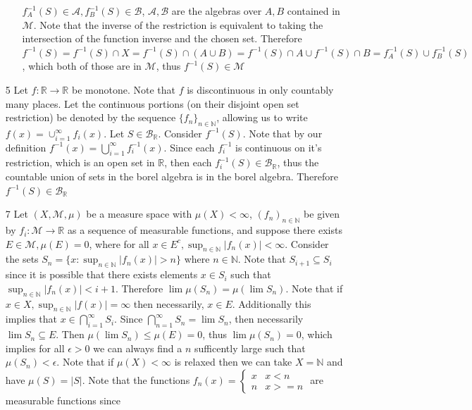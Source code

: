\documentclass[12pt, letterpaper]{article}
\newcommand{\N}{\mathbb{N}}
\newcommand{\R}{\mathbb{R}}
\begin{document}
\begin{enumerate}
\begin{itemize}
		$f_A^{-1}(S) \in \mathcal{A},f_B^{-1}(S) \in \mathcal{B}$, $\mathcal{A}, \mathcal{B}$ are the algebras over $A,B$ contained in $\mathcal{M}$.  Note that 
		the inverse of the restriction is equivalent to taking the intersection of the function inverse and the chosen set.  Therefore $f^{-1}(S) = f^{-1}(S) \cap X = f^{-1}(S) \cap (A \cup B) =
		f^{-1}(S) \cap A \cup f^{-1}(S) \cap B = f_A^{-1}(S) \cup f_B^{-1}(S)$, which 
		both of those are in $\mathcal{M}$, thus $f^{-1}(S) \in \mathcal{M}$
	\end{itemize}
	\item[5] Let $f: \R \to \R$ be monotone.  Note that $f$
	is discontinuous in only countably many places.  Let the continuous portions (on their disjoint open set restriction)
	be denoted by the sequence $\{f_n\}_{n \in \N}$, allowing us to write 
	$f(x) = \cup_{i=1}^\infty f_i(x)$.    Let $S \in \mathcal{B}_\R$.  
	Consider $f^{-1}(S)$.  Note that by our definition $f^{-1}(x) = \bigcup_{i=1}^\infty f^{-1}_i(x)$.  Since each $f_i^{-1}$ is continuous on it's restriction, which is an open
	set in $\R$, then each $f_i^{-1}(S) \in \mathcal{B}_\R$, thus the countable 
	union of sets in the borel algebra is in the borel algebra.  Therefore 
	$f^{-1}(S) \in \mathcal{B}_\R$
	\item[7] Let $(X, \mathcal{M}, \mu)$ be a measure space with $\mu(X) < \infty$, $(f_n)_{n \in \N}$ be given by $f_i: \mathcal{M} \to \R$ as a sequence of measurable functions, and suppose there exists $E \in \mathcal{M}, \mu(E) = 0$, where 
	for all $x \in E^c, \sup_{n \in \N}|f_n(x)| < \infty$.  Consider the sets 
	$S_n = \{x: \sup_{n \in \N}|f_n(x)| > n\}$ where $n \in \N$.  Note that $S_{i+1} \subseteq S_{i}$ since it is possible that there exists elements $x \in S_i$ such that 
	$\sup_{n \in \N} |f_n(x)| < i + 1$.  Therefore $\lim \mu(S_n) = \mu(\lim S_n)$.
	Note that if $x \in X, \sup_{n \in \N}|f(x)| = \infty$ then necessarily, $x \in E$.
	Additionally this implies that $x \in \bigcap_{i=1}^\infty S_i$.  Since 
	$\bigcap_{n=1}^\infty S_n = \lim S_n$, then necessarily 
	$\lim S_n \subseteq E$.  Then $\mu(\lim S_n) \leq \mu(E) = 0$, thus $\lim \mu(S_n) = 0$, which implies for all $\epsilon > 0$ we can always find a $n$ sufficently large such
	 that $\mu(S_n) < \epsilon$.  Note that if $\mu(X) < \infty$ is relaxed then we 
	 can take $X = \N$ and have $\mu(S) = |S|$.  Note that the functions $f_n(x) = 
	 \begin{cases} x & x < n\\ n & x >= n \end{cases}$ are measurable functions since 

\end{enumerate}
\end{document}
